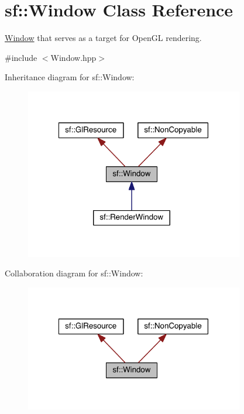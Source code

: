 \hypertarget{classsf_1_1_window}{\section{sf\-:\-:Window Class Reference}
\label{classsf_1_1_window}
}


\hyperlink{classsf_1_1_window}{Window} that serves as a target for Open\-G\-L rendering.  




{\ttfamily \#include $<$Window.\-hpp$>$}



Inheritance diagram for sf\-:\-:Window\-:
\nopagebreak
\begin{figure}[H]
\begin{center}
\leavevmode
\includegraphics[width=271pt]{classsf_1_1_window__inherit__graph}
\end{center}
\end{figure}


Collaboration diagram for sf\-:\-:Window\-:
\nopagebreak
\begin{figure}[H]
\begin{center}
\leavevmode
\includegraphics[width=271pt]{classsf_1_1_window__coll__graph}
\end{center}
\end{figure}
